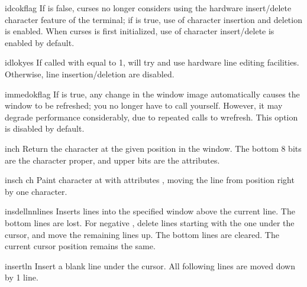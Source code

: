 \begin{methoddesc}[window]{idcok}{flag}
If  is false, curses no longer considers using the hardware
insert/delete character feature of the terminal; if  is
true, use of character insertion and deletion is enabled.  When curses
is first initialized, use of character insert/delete is enabled by
default.
\end{methoddesc}

\begin{methoddesc}[window]{idlok}{yes}
If called with  equal to 1,  will try and use
hardware line editing facilities. Otherwise, line insertion/deletion
are disabled.
\end{methoddesc}

\begin{methoddesc}[window]{immedok}{flag}
If  is true, any change in the window image
automatically causes the window to be refreshed; you no longer
have to call  yourself.  However, it may
degrade performance considerably, due to repeated calls to
wrefresh.  This option is disabled by default.
\end{methoddesc}

\begin{methoddesc}[window]{inch}{}
Return the character at the given position in the window. The bottom
8 bits are the character proper, and upper bits are the attributes.
\end{methoddesc}

\begin{methoddesc}[window]{insch}{ ch}
Paint character  at  with attributes
, moving the line from position  right by one
character.
\end{methoddesc}

\begin{methoddesc}[window]{insdelln}{nlines}
Inserts  lines into the specified window above the current
line.  The  bottom lines are lost.  For negative
, delete  lines starting with the one under
the cursor, and move the remaining lines up.  The bottom 
lines are cleared.  The current cursor position remains the same.
\end{methoddesc}

\begin{methoddesc}[window]{insertln}{}
Insert a blank line under the cursor. All following lines are moved
down by 1 line.
\end{methoddesc}

